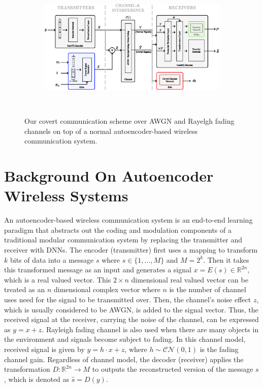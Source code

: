 \begin{figure}[thp]
	\center
	\begin{subfigure}{0.8\textwidth}
	\includegraphics[width=\linewidth]{figs/system_architecture}
	\end{subfigure}
	\\
	\caption{Our covert communication scheme over AWGN and Rayelgh fading channels on top of a normal autoencoder-based wireless communication system.}	
	\label{fig:system_architecture}
\end{figure}
\section{Background On Autoencoder Wireless Systems}
\label{s:background}
An autoencoder-based wireless communication system is an end-to-end learning paradigm that abstracts out the coding and modulation components of a  traditional modular communication system by replacing the transmitter and receiver with DNNs. The encoder (transmitter) first uses a mapping to transform \(k\) bits of data into a message \(s\) where \(s \in \{1,...,M\}\) and \(M = 2^k\). Then it takes this transformed message as an input and generates a signal \(x = E(s) \in \mathbb{R}^{2n}\), which is a real valued vector. This \(2 \times n\) dimensional real valued vector can be treated as an \(n\) dimensional complex vector where \(n\) is the number of channel uses need for the signal to be transmitted over. Then, the channel's noise effect \(z\), which is usually considered to be AWGN, is added to the signal vector. Thus, the received signal at the receiver, carrying the noise of the channel, can be expressed as \(y = x + z\). Rayleigh fading channel is also used when there are many objects in the environment and signals become subject to fading. In this channel model, received signal is given by \(y = h \cdot x + z\), where \(h \sim \mathcal{CN}(0, 1)\) is the fading channel gain. Regardless of channel model, the decoder (receiver) applies the transformation \(D: \mathbb{R}^{2n} \rightarrow M \) to outputs the reconstructed version of the message \(s\), which is denoted as \(\hat{s} = D(y)\).
